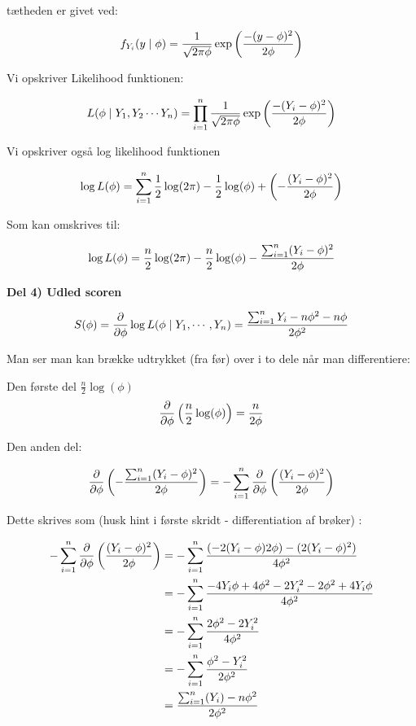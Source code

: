 tætheden er givet ved:

\begin{equation}
    f_{Y_i} (y \mid \phi) = \frac{1}{\sqrt{2\pi \phi}} \exp \left( \frac{- (y - \phi)^2 }{2\phi}\right)
\end{equation}

Vi opskriver Likelihood funktionen:

\begin{equation}
    L(\phi \mid Y_1, Y_2 \cdots Y_n) = \prod_{i=1}^{n}  \frac{1}{\sqrt{2\pi \phi}} \exp \left( \frac{- (Y_i - \phi)^2 }{2\phi}\right)
\end{equation}

Vi opskriver også log likelihood funktionen

\begin{equation}
    \log L( \phi) = \sum_{i=1}^{n} \frac{1}{2}\log(2\pi) - \frac{1}{2}\log (\phi) + \left( -\frac{(Y_i - \phi)^2}{2\phi} \right)
\end{equation}

Som kan omskrives til:

\begin{equation}
    \log L( \phi) = \frac{n}{2}\log(2\pi) - \frac{n}{2}\log (\phi)  -\frac{ \sum_{i=1}^{n} (Y_i - \phi)^2}{2\phi}
\end{equation}

\textbf{Del 4) Udled scoren}

\begin{equation}
    S(\phi) = \frac{\partial}{\partial \phi} \log L (\phi \mid Y_1, \cdots , Y_n) = \frac{\sum_{i=1}^{n} Y_i - n\phi^2 - n\phi}{2\phi^2}
\end{equation}

Man ser man kan brække udtrykket (fra før) over i to dele når man differentiere:


Den første del $\frac{n}{2}\log (\phi)$
\begin{equation}
    \frac{\partial}{\partial\phi} \left( \frac{n}{2}\log (\phi) \right) = \frac{n}{2\phi}
\end{equation}

Den anden del:

\begin{equation}
    \frac{\partial}{\partial \phi} \left(  -\frac{ \sum_{i=1}^{n} (Y_i - \phi)^2}{2\phi} \right) = - \sum_{i=1}^{n} \frac{\partial}{\partial \phi} \left(  \frac{ (Y_i - \phi)^2}{2\phi} \right)
\end{equation}

Dette skrives som (husk hint i første skridt - differentiation af brøker)
:

\begin{align}
    - \sum_{i=1}^{n} \frac{\partial}{\partial \phi} \left(  \frac{ (Y_i - \phi)^2}{2\phi} \right) &= - \sum_{i=1}^{n} \frac{(-2(Y_i - \phi)2\phi) - (2(Y_i - \phi)^2)}{4\phi^2} \\
    &= - \sum_{i=1}^{n} \frac{-4Y_i\phi + 4\phi^2 - 2Y_i^2 - 2\phi^2 + 4Y_i\phi}{4\phi^2} \\
    &= - \sum_{i=1}^{n} \frac{2 \phi^2 - 2 Y_i^2}{4\phi^2} \\
    &= - \sum_{i=1}^{n} \frac{\phi^2 - Y_i^2}{2\phi^2} \\
    &= \frac{\sum_{i=1}^{n}( Y_i ) - n \phi^2}{2\phi^2} \\
\end{align}

